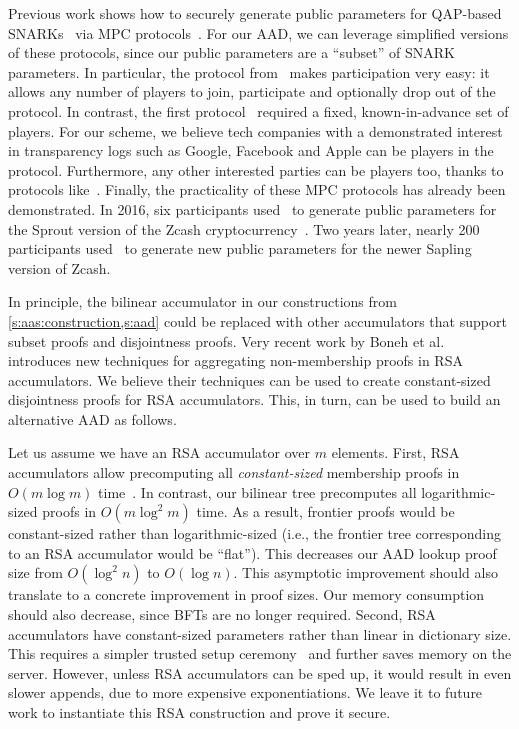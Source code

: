 Previous work shows how to securely generate public parameters for QAP-based SNARKs~\cite{groth10,groth16} via MPC protocols~\cite{zcash-mpc1,zcash-mpc2}.
For our AAD, we can leverage simplified versions of these protocols, since our public parameters are a ``subset'' of SNARK parameters.
In particular, the protocol from~\cite{zcash-mpc2} makes participation very easy: it allows any number of players to join, participate and optionally drop out of the protocol.
In contrast, the first protocol~\cite{zcash-mpc1} required a fixed, known-in-advance set of players.
For our scheme, we believe tech companies with a demonstrated interest in transparency logs such as Google, Facebook and Apple can be players in the protocol.
Furthermore, any other interested parties can be players too, thanks to protocols like~\cite{zcash-mpc2}.
Finally, the practicality of these MPC protocols has already been demonstrated.
In 2016, six participants used~\cite{zcash-mpc1} to generate public parameters for the Sprout version of the Zcash cryptocurrency~\cite{zcash}.
Two years later, nearly 200 participants used~\cite{zcash-mpc2} to generate new public parameters for the newer Sapling version of Zcash.

In principle, the bilinear accumulator in our constructions from \cref{s:aas:construction,s:aad} could be replaced with other accumulators that support subset proofs and disjointness proofs.
Very recent work by Boneh et al.~\cite{batch-rsa-acc} introduces new techniques for aggregating non-membership proofs in RSA accumulators.
We believe their techniques can be used to create constant-sized disjointness proofs for RSA accumulators.
This, in turn, can be used to build an alternative AAD as follows.

Let us assume we have an RSA accumulator over $m$ elements.
First, RSA accumulators allow precomputing all \textit{constant-sized} membership proofs in $O(m\log{m})$ time~\cite{blind-auditable-memb-proofs}.
In contrast, our bilinear tree precomputes all logarithmic-sized proofs in $O(m\log^2{m})$ time.
As a result, frontier proofs would be constant-sized rather than logarithmic-sized (i.e., the frontier tree corresponding to an RSA accumulator would be ``flat'').
This decreases our AAD lookup proof size from $O(\log^2{n})$ to $O(\log{n})$.
This asymptotic improvement should also translate to a concrete improvement in proof sizes.
Our memory consumption should also decrease, since BFTs are no longer required.
Second, RSA accumulators have constant-sized parameters rather than linear in dictionary size.
This requires a simpler trusted setup ceremony~\cite{Frederiksen2018} and further saves memory on the server.
However, unless RSA accumulators can be sped up, it would result in even slower appends, due to more expensive exponentiations.
We leave it to future work to instantiate this RSA construction and prove it secure.


